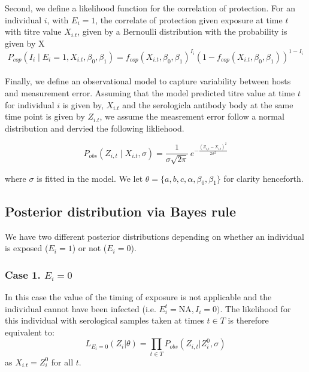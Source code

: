 \documentclass{article}
\begin{document}
Second, we define a likelihood function for the correlation of protection. For an individual $i$, with $E_i = 1$, the correlate of protection given exposure at time $t$ with titre value $X_{i.t}$, given by a Bernoulli distribution with the probability is given by X
\begin{equation}
\label{eq:ll_cop}
P_{cop}(I_i \mid E_i = 1, X_{i.t}, \beta_0, \beta_1) =  f_{cop}(X_{i.t},  \beta_0, \beta_1)^{I_i}(1- f_{cop}(X_{i.t},  \beta_0, \beta_1))^{1-I_i}
\end{equation}

\paragraph{}Finally, we define an observational model to capture variability between hosts and measurement error. Assuming that the model predicted titre value at time $t$ for individual $i$ is given by, $X_{i.t}$ and the serologicla antibody body at the same time point is given by $Z_{i.t}$, we assume the measrement error follow a normal distribution and dervied the following likliehood.

\begin{equation}
\label{eq:ll_obs}
P_{obs}(Z_{i,t} \mid X_{i.t}, \sigma) = \frac{1}{\sigma \sqrt{2\pi}} \, e^{-\frac{(Z_{i,t} - X_{i.t})^2}{2\sigma^2}}
\end{equation}

where $\sigma$ is fitted in the model. We let $\theta = \{a,b, c, \alpha, \beta_0, \beta_1\}$ for clarity henceforth. 


\subsection{Posterior distribution via Bayes rule}

We have two different posterior distributions depending on whether an individual is exposed ($E_i = 1$) or not ($E_i = 0$).

\subsubsection{Case 1. $E_i = 0$} 
In this case the value of the timing of exposure is not applicable and the individual cannot have been infected (i.e. $E^t_i = \text{NA}, I_i = 0)$. The likelihood  for this individual with serological samples taken at times $t\in T$ is therefore equivalent to:
\begin{equation}
L_{E_i = 0}(Z_{i}| \theta) = \prod_{t \in T}P_{obs}(Z_{i,t}|Z^0_{i}, \sigma)
\end{equation}
as $X_{i.t} = Z^0_{i}$ for all $t$.
\end{document}
